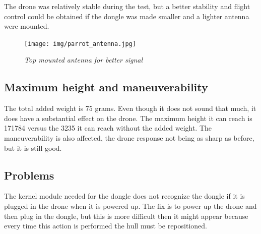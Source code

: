 The drone was relatively stable during the test, but a better stability and flight control could be obtained if the dongle was made smaller and a lighter antenna were mounted.


\begin{figure}[ht]
\begin{center}
\texttt{[image: img/parrot\_antenna.jpg]}
\end{center}
\caption{\small \itshape{Top mounted antenna for better signal}}
\end{figure}

\subsection{Maximum height and maneuverability}

The total added weight is 75 grams. Even though it does not sound that much, it does have a substantial effect on the drone. The maximum height it can reach is 171784 versus the 3235 it can reach without the added weight. The maneuverability is also affected, the drone response not being as sharp as before, but it is still good.

\subsection{Problems}

The kernel module needed for the dongle does not recognize the dongle if it is plugged in the drone when it is powered up. The fix is to power up the drone and then plug in the dongle, but this is more difficult then it might appear because every time this action is performed the hull must be repositioned.

\clearpage
